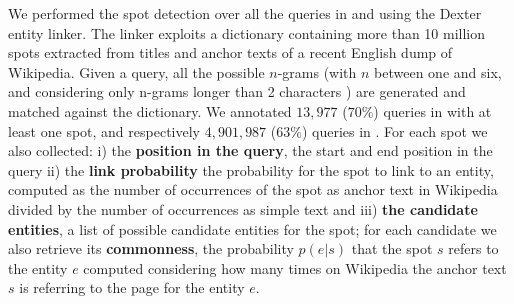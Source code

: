We performed the spot detection over all the queries in \tail{} and \head{} using the Dexter~\cite{ceccarelli2013dexter} entity linker. 
The linker exploits a dictionary containing more than 10 million spots extracted from titles and anchor texts of a recent English dump 
of Wikipedia. Given a query, all the possible $n$-grams (with $n$ between one and six, and considering only n-grams longer than 2 characters ) are generated and matched against the dictionary. We annotated $13,977$ ($70\%$)
queries in \head{} with at least one spot, and respectively $4,901,987$ ($63\%$) queries in \tail{}. For each spot we also collected: 
i) the \textbf{position in the query}, the start and end position in the query ii) the \textbf{link probability} the probability
for the spot to link to an entity, computed as the number of occurrences of the spot as anchor text in Wikipedia divided by the number of occurrences
as simple text and iii) \textbf{the candidate entities}, a list of possible candidate entities for the spot; for each candidate we also retrieve
its \textbf{commonness}, the probability $p(e|s)$ that the spot $s$ refers to the entity $e$ computed considering how many times on Wikipedia
the anchor text $s$ is referring to the page for the entity $e$.









